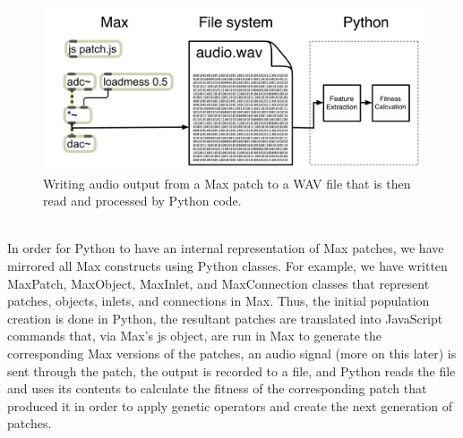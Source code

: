 \documentclass[a4paper,12pt]{report} 	%
\numberwithin{figure}{chapter}
\numberwithin{table}{chapter}
\numberwithin{equation}{chapter}
\begin{document}
\begin{flushleft}
\begin{figure}[h!]
\begin{center}
\includegraphics[scale=0.4]{MaxAudioToPython}
\caption[From Max to Python]{Writing audio output from a Max patch to a WAV file that is then read and processed by Python code.}
\end{center}
\end{figure}
\\
In order for Python to have an internal representation of Max patches, we have mirrored all Max constructs using Python classes. For example, we have written MaxPatch, MaxObject, MaxInlet, and MaxConnection classes that represent patches, objects, inlets, and connections in Max. Thus, the initial population creation is done in Python, the resultant patches are translated into JavaScript commands that, via Max's js object, are run in Max to generate the corresponding Max versions of the patches, an audio signal (more on this later) is sent through the patch, the output is recorded to a file, and Python reads the file and uses its contents to calculate the fitness of the corresponding patch that produced it in order to apply genetic operators and create the next generation of patches.


\end{flushleft}
\end{document}
